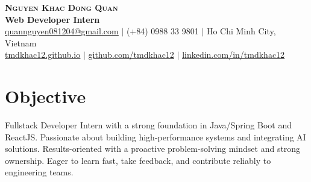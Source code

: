 \documentclass[letterpaper,11pt]{article}
\begin{document}
\begin{flushright}
  \color{gray}
\end{flushright}

\vspace{-5pt}

\begin{center}
    \textbf{\Huge \scshape Nguyen Khac Dong Quan} \\ \vspace{4pt}
    \small \textbf{Web Developer Intern} \\ \vspace{4pt}
    \small 
     \href{mailto:quannguyen081204@gmail.com}{\underline{quannguyen081204@gmail.com}} $|$
     (+84) 0988 33 9801 $|$ 
     Ho Chi Minh City, Vietnam \\ \vspace{4pt}
     \href{https://tmdkhac12.github.io/}{\underline{tmdkhac12.github.io}} $|$ 
     \href{https://github.com/tmdkhac12}{\underline{github.com/tmdkhac12}} $|$ 
     \href{https://linkedin.com/in/tmdkhac12}{\underline{linkedin.com/in/tmdkhac12}}
\end{center}

\section{Objective}
\small{Fullstack Developer Intern with a strong foundation in Java/Spring Boot and ReactJS.
Passionate about building high-performance systems and integrating AI solutions.
Results-oriented with a proactive problem-solving mindset and strong ownership.
Eager to learn fast, take feedback, and contribute reliably to engineering teams.}

\end{document}
